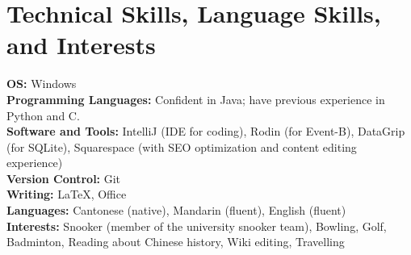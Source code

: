 \documentclass[letterpaper,10pt]{article}
\begin{document}
\section{Technical Skills, Language Skills, and Interests}
 \begin{itemize}[leftmargin=0.15in, label={}]
    \small{\item{
    \textbf{OS:} Windows \\
    \textbf{Programming Languages:} Confident in Java; have previous experience in Python and C. \\
    \textbf{Software and Tools:} IntelliJ (IDE for coding), Rodin (for Event-B), DataGrip (for SQLite), Squarespace (with SEO optimization and content editing experience) \\
    \textbf{Version Control:} Git \\
    \textbf{Writing:} \LaTeX, Office \\
    \textbf{Languages:} Cantonese (native), Mandarin (fluent), English (fluent) \\
    \textbf{Interests:} Snooker (member of the university snooker team), Bowling, Golf, Badminton, Reading about Chinese history, Wiki editing, Travelling
    }}
 \end{itemize}
\end{document}

